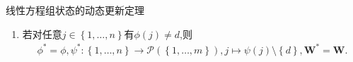 \begin{theorem}{线性方程组状态的动态更新定理}{}
\begin{enumerate}
\begin{gather*}
\begin{cases}
				\boldsymbol{w}_{k},&\text{其他}
			\end{cases}
		\end{gather*}
		其中$A=\left\{v\in\psi\left(\ell\right)\cap\psi\left(j\right)\middle|\langle\boldsymbol{u}_{v}\mid\boldsymbol{w}_{j}\rangle\langle\boldsymbol{u}_{r}\mid\boldsymbol{w}_{\ell}\rangle\neq\langle\boldsymbol{u}_{r}\mid\boldsymbol{w}_{j}\rangle\langle\boldsymbol{u}_{v}\mid\boldsymbol{w}_{\ell}\rangle\right\}$.
		\item 若对任意$j\in\left\{1,\ldots,n\right\}$有$\phi\left(j\right)\neq d$,则
		\begin{align*}
			\phi^{\ast}=\phi,\psi^{\ast}:\left\{1,\ldots,n\right\}\to\mathcal{P}\left(\left\{1,\ldots,m\right\}\right),j\mapsto\psi\left(j\right)\setminus\left\{d\right\},\boldsymbol{W}^{\ast}=\boldsymbol{W}.
		\end{align*}
	\end{enumerate}
\end{theorem}














